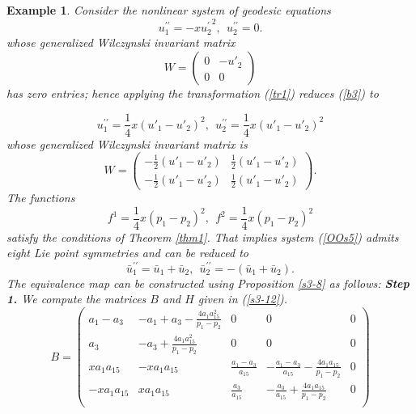 \documentclass[12pt]{article}
\newtheorem{example}[theorem]{Example}
\begin{document}
\begin{example}
 Consider the nonlinear system of geodesic equations
\begin{equation}\label{b3}
u_1^{\prime\prime}=-x{u^{'}_2}^{2},~~u_2^{\prime\prime}=0.
 \end{equation}
whose generalized Wilczynski invariant matrix 
\begin{equation}
W=\begin{pmatrix}
0&-u'_2\\
0&0\end{pmatrix}\end{equation}
 has zero entries; hence applying the transformation (\ref{tr1}) reduces (\ref{b3}) to

\begin{equation}\label{OOs5}
u_1^{\prime\prime}=\frac{1}{4}x(u'_1-u'_2)^2,~~u_2^{\prime\prime}=\frac{1}{4}x(u'_1-u'_2)^2
 \end{equation}
whose generalized Wilczynski invariant matrix is
\begin{equation}
W=\begin{pmatrix}
-\frac{1}{2}(u'_1-u'_2)&\frac{1}{2}(u'_1-u'_2)\\
-\frac{1}{2}(u'_1-u'_2)&\frac{1}{2}(u'_1-u'_2)\end{pmatrix}.\end{equation}
The functions
\begin{equation}\label{Os8}
 f^1=\frac{1}{4}x(p_1-p_2)^2,~~f^2=\frac{1}{4}x(p_1-p_2)^2
\end{equation}
 satisfy the conditions of Theorem \ref{thm1}. That implies system (\ref{OOs5}) admits eight Lie point symmetries and can be reduced to
\begin{equation}\label{b4}
\bar{u}_1^{\prime\prime}=\bar{u}_1+\bar{u}_2,~~\bar{u}_2^{\prime\prime}=-(\bar{u}_1+\bar{u}_2).
\end{equation}
The equivalence map can be constructed using Proposition \ref{s3-8} as follows:
 \textbf{Step 1.} We compute the matrices $B$ and $H$ given in (\ref{s3-12}). \\
\begin{equation}\label{OOE10}
B=\begin{pmatrix}
a_1-a_3&-a_1+a_3-\frac{4a_1a_{15}^2}{p_1-p_2}&0&0&0\\
a_3&-a_3+\frac{4a_1a_{15}^2}{p_1-p_2}&0&0&0\\
xa_1a_{15}&-xa_1a_{15}&\frac{a_1-a_3}{a_{15}}&-\frac{a_1-a_3}{a_{15}}-\frac{4a_1a_{15}}{p_1-p_2}&0\\
-xa_1a_{15}&xa_1a_{15}&\frac{a_3}{a_{15}}&-\frac{a_3}{a_{15}}+\frac{4a_1a_{15}}{p_1-p_2}&0\\

\end{pmatrix}
\end{equation}
\end{example}
\end{document}
